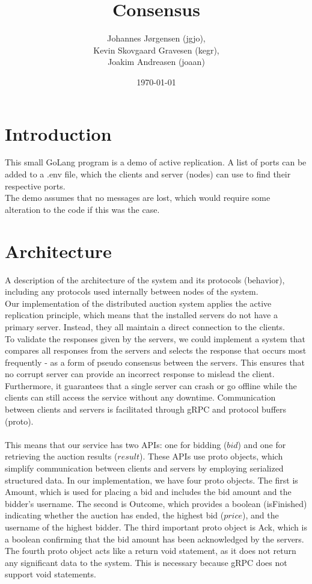 \documentclass[a4paper,11pt]{article}
\title{Consensus}
\author{Johannes Jørgensen (jgjo),\\ Kevin Skovgaard Gravesen (kegr),\\ Joakim Andreasen (joaan)}
\date{\today}
\begin{document}
 

\maketitle

\section{Introduction}
This small GoLang program is a demo of active replication. A list of ports can be added to a .env file,
which the clients and server (nodes) can use to find their respective ports.
\\
The demo assumes that no messages are lost, which would require some alteration to the code if this was the case.

\section{Architecture}
A description of the architecture of the system and its protocols (behavior), including any protocols used internally between nodes of the system.\\
Our implementation of the distributed auction system applies the active replication principle, which means that the installed servers do not have a primary server. Instead, they all maintain a direct connection to the clients.\\
To validate the responses given by the servers, we could implement a system that compares all responses from the servers and selects the response that occurs most frequently - as a form of pseudo consensus between the servers. This ensures that no corrupt server can provide an incorrect response to mislead the client.
Furthermore, it guarantees that a single server can crash or go offline while the clients can still access the service without any downtime. Communication between clients and servers is facilitated through gRPC and protocol buffers (proto).\\\\
This means that our service has two APIs: one for bidding ($bid$) and one for retrieving the auction results ($result$). These APIs use proto objects, which simplify communication between clients and servers by employing serialized structured data.
In our implementation, we have four proto objects. The first is Amount, which is used for placing a bid and includes the bid amount and the bidder’s username. The second is Outcome, which provides a boolean (isFinished) indicating whether the auction has ended, the highest bid ($price$), and the username of the highest bidder. The third important proto object is Ack, which is a boolean confirming that the bid amount has been acknowledged by the servers.
The fourth proto object acts like a return void statement, as it does not return any significant data to the system. This is necessary because gRPC does not support void statements.
\end{document}
